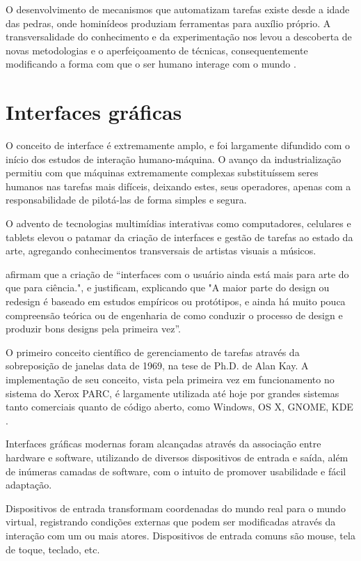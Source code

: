 O desenvolvimento de mecanismos que automatizam tarefas existe desde a idade das
pedras, onde hominídeos produziam ferramentas para auxílio próprio. A
transversalidade do conhecimento e da experimentação nos levou a descoberta de
novas metodologias e o aperfeiçoamento de técnicas, consequentemente modificando
a forma com que o ser humano interage com o mundo \cite[p.
1]{sartori2010neurociencia}.

\section{Interfaces gráficas}

O conceito de interface é extremamente amplo, e foi largamente difundido com o
início dos estudos de interação humano-máquina. O avanço da industrialização
permitiu com que máquinas extremamente complexas substituíssem seres humanos nas
tarefas mais difíceis,  deixando estes, seus operadores, apenas com a
responsabilidade de pilotá-las de forma simples e segura.

O advento de tecnologias multimídias interativas como computadores, celulares e
tablets elevou o patamar da criação de interfaces e gestão de tarefas ao estado
da arte, agregando conhecimentos transversais de artistas visuais a músicos.

 afirmam que a criação de “interfaces
com o usuário ainda está mais para arte do que para ciência.", e justificam,
explicando que "A maior parte do design ou redesign é baseado em estudos
empíricos ou protótipos, e ainda há muito pouca compreensão teórica ou de
engenharia de como conduzir o processo de design e produzir bons designs pela
primeira vez”.

O primeiro conceito científico de gerenciamento de tarefas através da
sobreposição de janelas data de 1969, na tese de Ph.D. de Alan Kay. A
implementação de seu conceito, vista pela primeira vez em funcionamento no
sistema do Xerox PARC, é largamente utilizada até hoje por grandes sistemas
tanto comerciais quanto de código aberto, como Windows, OS X, GNOME, KDE
\cite[p. 7]{myers2000past}.

Interfaces gráficas modernas foram alcançadas através da associação entre
hardware e software, utilizando de diversos dispositivos de entrada e saída,
além de  inúmeras camadas de software, com o intuito de promover usabilidade e
fácil adaptação.

Dispositivos de entrada transformam coordenadas do mundo real para o mundo
virtual, registrando condições externas que podem ser modificadas através da
interação com um ou mais atores. Dispositivos de entrada comuns são mouse, tela
de toque, teclado, etc.

